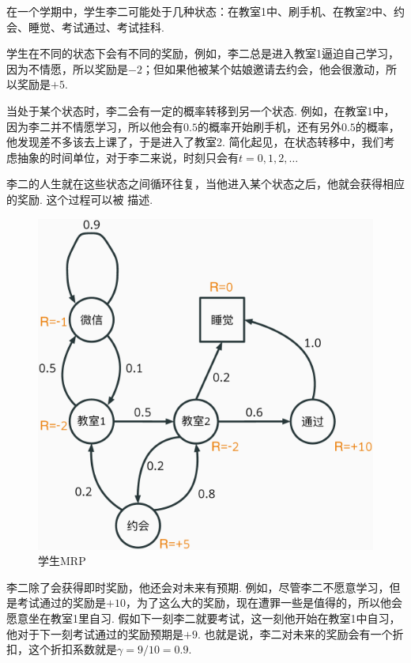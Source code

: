 \begin{example}[李二的MRP]\label{ex:lier-MRP}
在一个学期中，学生李二可能处于几种状态：在教室1中、刷手机、在教室2中、约会、睡觉、考试通过、考试挂科. 

学生在不同的状态下会有不同的奖励，例如，李二总是进入教室1逼迫自己学习，因为不情愿，所以奖励是$-2$；但如果他被某个姑娘邀请去约会，他会很激动，所以奖励是$+5$. 

当处于某个状态时，李二会有一定的概率转移到另一个状态. 例如，在教室1中，因为李二并不情愿学习，所以他会有$0.5$的概率开始刷手机，还有另外$0.5$的概率，他发现差不多该去上课了，于是进入了教室2. 简化起见，在状态转移中，我们考虑抽象的时间单位，对于李二来说，时刻只会有$t=0,1,2,\dots$

李二的人生就在这些状态之间循环往复，当他进入某个状态之后，他就会获得相应的奖励. 这个过程可以被 描述. 
\begin{figure}[ht]
    \centering
    \includegraphics[height=0.4\textheight]{Figures/Markov-chain/STR.eps}
    \caption{学生MRP}
    \label{fig:student-MRP}
\end{figure}

李二除了会获得即时奖励，他还会对未来有预期. 例如，尽管李二不愿意学习，但是考试通过的奖励是$+10$，为了这么大的奖励，现在遭罪一些是值得的，所以他会愿意坐在教室1里自习. 假如下一刻李二就要考试，这一刻他开始在教室1中自习，他对于下一刻考试通过的奖励预期是$+9$. 也就是说，李二对未来的奖励会有一个折扣，这个折扣系数就是$\gamma=9/10=0.9$.
\end{example}

